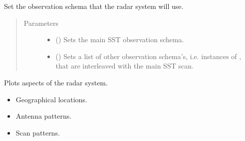 \documentclass[letterpaper,10pt,english]{sphinxmanual}
\begin{document}
\begin{fulllineitems}
\begin{fulllineitems}
\end{fulllineitems}


\begin{fulllineitems}
\label{\detokenize{modules/radar_config:radar_config.RadarSystem.set_scan}}
Set the observation schema that the radar system will use.
\begin{quote}\begin{description}
\item[{Parameters}] \leavevmode\begin{itemize}
\item {} 
 () \textendash{} Sets the main SST observation schema.

\item {} 
 () \textendash{} Sets a list of other observation schema’s, i.e. instances of , that are interleaved with the main SST scan.

\end{itemize}

\end{description}\end{quote}

\end{fulllineitems}


\end{fulllineitems}


\begin{fulllineitems}
\label{\detokenize{modules/radar_config:radar_config.plot_radar}}
Plots aspects of the radar system.

\begin{itemize}
\item {} 
Geographical locations.

\item {} 
Antenna patterns.

\item {} 
Scan patterns.

\end{itemize}

\end{fulllineitems}
\end{document}
